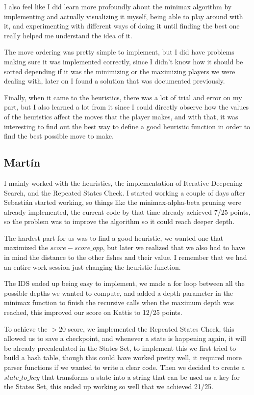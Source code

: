 \documentclass[12pt]{article}
\begin{document}
I also feel like I did learn more profoundly about the minimax algorithm by implementing and actually visualizing it myself, being able to play around with it, and experimenting with different ways of doing it until finding the best one really helped me understand the idea of it. 

The move ordering was pretty simple to implement, but I did have problems making sure it was implemented correctly, since I didn't know how it should be sorted depending if it was the minimizing or the maximizing players we were dealing with, later on I found a solution that was documented previously.

Finally, when it came to the heuristics, there was a lot of trial and error on my part, but I also learned a lot from it since I could directly observe how the values of the heuristics affect the moves that the player makes, and with that, it was interesting to find out the best way to define a good heuristic function in order to find the best possible move to make.

\subsection{Martín}

I mainly worked with the heuristics, the implementation of Iterative Deepening Search, and the Repeated States Check. I started working a couple of days after Sebastián started working, so things like the minimax-alpha-beta pruning were already implemented, the current code by that time already achieved 7/25 points, so the problem was to improve the algorithm so it could reach deeper depth.

The hardest part for us was to find a good heuristic, we wanted one that maximized the $score - score\_opp$, but later we realized that we also had to have in mind the distance to the other fishes and their value. I remember that we had an entire work session just changing the heuristic function.

The IDS ended up being easy to implement, we made a for loop between all the possible depths we wanted to compute, and added a depth parameter in the minimax function to finish the recursive calls when the maximum depth was reached, this improved our score on Kattis to 12/25 points.

To achieve the $>20$ score, we implemented the Repeated States Check, this allowed us to save a checkpoint, and whenever a state is happening again, it will be already precalculated in the States Set, to implement this we first tried to build a hash table, though this could have worked pretty well, it required more parser functions if we wanted to write a clear code. Then we decided to create a $state\_to\_key$ that transforms a state into a string that can be used as a key for the States Set, this ended up working so well that we achieved 21/25.
\end{document}

